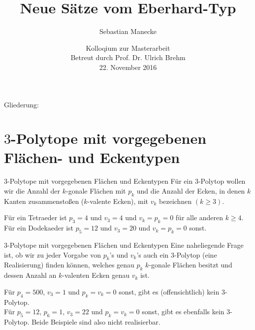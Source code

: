 \documentclass[10pt, notheorems]{beamer}
\begin{document}
\title{Neue Sätze vom {\sc Eberhard}-Typ}
\author{Sebastian Manecke}
\date{Kolloqium zur Masterarbeit\\Betreut durch Prof. Dr. Ulrich Brehm\\22. November 2016}



\frame{\titlepage}



\begin{frame}
  Gliederung:
\tableofcontents
\end{frame}
\section{$3$-Polytope mit vorgegebenen Flächen- und Eckentypen}
\begin{frame}{$3$-Polytope mit vorgegebenen Flächen und Eckentypen}
  Für ein $3$-Polytop wollen wir die Anzahl der $k$-gonale Flächen mit $p_k$ und die Anzahl der Ecken, in denen $k$ Kanten zusammenstoßen ($k$-valente Ecken), mit $v_k$ bezeichnen $(k \geq 3)$.
  \pause
  \begin{example}
    Für ein Tetraeder ist $p_3 = 4$ und $v_3 = 4$ und $v_k = p_k = 0$ für alle anderen $k \geq 4$.\\
    \pause
    Für ein Dodekaeder ist $p_5 = 12$ und $v_3 = 20$ und $v_k = p_k = 0$ sonst.\\
  \end{example}
\end{frame}
\begin{frame}{$3$-Polytope mit vorgegebenen Flächen und Eckentypen}
  Eine naheliegende Frage ist, ob wir zu jeder Vorgabe von $p_k$'s und $v_k$'s auch ein $3$-Polytop (eine Realisierung) finden können, welches genau $p_k$ $k$-gonale Flächen besitzt und dessen Anzahl an $k$-valenten Ecken genau $v_k$ ist.
  \pause
  \begin{example}
    Für $p_4 = 500$, $v_3 = 1$ und $p_k = v_k = 0$ sonst, gibt es (offensichtlich) kein $3$-Polytop.\\
    \pause
    Für $p_5 = 12$, $p_6 = 1$, $v_3 = 22$ und $p_k = v_k = 0$ sonst, gibt es ebenfalls kein $3$-Polytop. Beide Beispiele sind also nicht realisierbar.
  \end{example}
\end{frame}
\end{document}
